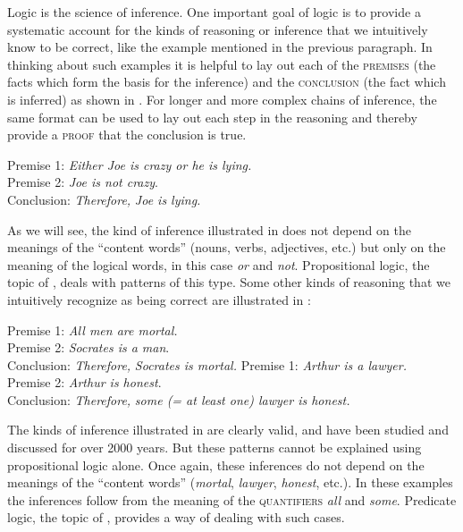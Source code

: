 Logic is the science of inference. One important goal of logic is to provide a systematic account for the kinds of reasoning or inference that we intuitively know to be correct, like the example mentioned in the previous paragraph. In thinking about such examples it is helpful to lay out each of the \textsc{premises} (the facts which form the basis for the inference) and the \textsc{conclusion} (the fact which is inferred) as shown in . For longer and more complex chains of inference, the same format can be used to lay out each step in the reasoning and thereby provide a \textsc{proof} that the conclusion is true.


\ea \label{ex:4.1}
Premise 1: \textit{Either Joe is crazy or he is lying.}\\
Premise 2: \textit{Joe is not crazy}.\\
\FelixHRule
Conclusion: \textit{Therefore,} \textit{Joe is lying.}
\z


As we will see, the kind of inference illustrated in  does not depend on the meanings of the “content words” (nouns, verbs, adjectives, etc.) but only on the meaning of the logical words, in this case \textit{or} and \textit{not}. Propositional logic, the topic of , deals with patterns of this type. Some other kinds of reasoning that we intuitively recognize as being correct are illustrated in :


\ea \label{ex:4.2}
\ea  Premise 1: \textit{All men are mortal.}\\
Premise 2: \textit{Socrates is a man}.\\
\FelixHRule
Conclusion: \textit{Therefore,} \textit{Socrates is mortal.}
\ex Premise 1: \textit{Arthur is a lawyer.}\\
Premise 2: \textit{Arthur is honest}.\\
\FelixHRule
Conclusion: \textit{Therefore,} \textit{some (= at least one) lawyer is honest.}
                       \z
\z


The kinds of inference illustrated in  are clearly valid, and have been studied and discussed for over 2000 years. But these patterns cannot be explained using propositional logic alone. Once again, these inferences do not depend on the meanings of the “content words” (\textit{mortal}, \textit{lawyer}, \textit{honest}, etc.). In these examples the inferences follow from the meaning of the \textsc{quantifiers} \textit{all} and \textit{some}. Predicate logic, the topic of , provides a way of dealing with such cases.



